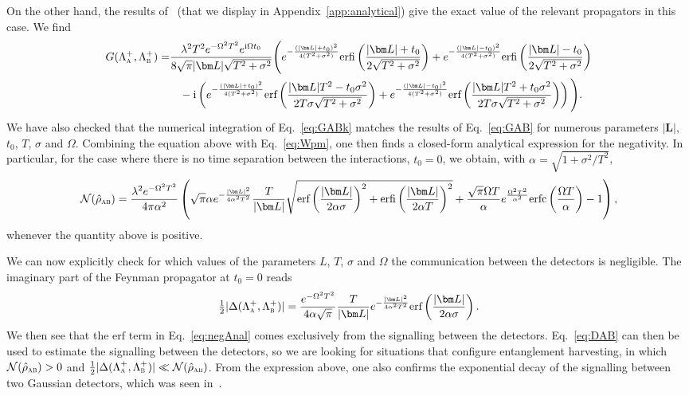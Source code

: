 \documentclass[letterpaper,12pt,titlepage,oneside,final]{book}
\newcommand{\ii}{\mathrm{i}}
\newcommand{\tc}[1]{\textsc{#1}}
\begin{document}
On the other hand, the results of~\cite{analytical} (that we display in Appendix~\ref{app:analytical}) give the exact value of the relevant propagators in this case. We find
\begin{align}
    G(\Lambda_\tc{a}^+,\Lambda_\tc{b}^+) =
    &\frac{\lambda^2 T^2e^{-\Omega^2T^2}e^{\ii \Omega t_0}}{8 \sqrt{\pi} |\bm L| \sqrt{T^2+\sigma^2}}\Bigg(e^{- \frac{(|\bm L| + t_0)^2}{4(T^2 + \sigma^2)}}\text{erfi}\left(\frac{|\bm L| +t_0}{2\sqrt{T^2 + \sigma^2}}\right)+e^{- \frac{(|\bm L| - t_0)^2}{4(T^2 + \sigma^2)}}\text{erfi}\left(\frac{|\bm L| -t_0}{2\sqrt{T^2 + \sigma^2}}\right)\nonumber\\
    &\:\:\:\:-\ii\left(e^{-\frac{(|\bm L| + t_0)^2}{4 (T^2 + \sigma^2)}}\text{erf}\left(\frac{|\bm L|T^2 - t_0\sigma^2 }{2 T \sigma\sqrt{T^{2} + \sigma^{2}}}\right)+e^{-\frac{(|\bm L| - t_0)^2}{4 (T^2 + \sigma^2)}} \text{erf}\left(\frac{|\bm L|T^2 + t_0\sigma^2 }{2 T \sigma\sqrt{T^{2} + \sigma^{2}}}\right)\right)\Bigg).\label{eq:GAB}
\end{align}
We have also checked that the numerical integration of Eq.~\eqref{eq:GABk} matches the results of Eq.~\eqref{eq:GAB} for numerous parameters $|\bm L|$, $t_0$, $T$, $\sigma$ and $\Omega$. Combining the equation above with Eq.~\eqref{eq:Wpm}, one then finds a closed-form analytical expression for the negativity. In particular, for the case where there is no time separation between the interactions, $t_0 = 0$, we obtain, with $\alpha = \sqrt{1 + \sigma^2/T^2}$,{\footnotesize
\begin{equation}
    \mathcal{N}(\hat{\rho}_\tc{ab}) = \frac{\lambda^2 e^{-\Omega^2 T^2}}{4\pi \alpha^2 } \left(\sqrt{\pi}\alpha e^{- \frac{|\bm L|^2}{4\alpha^2T^2}}\frac{T}{|\bm L| }\sqrt{\text{erf}\left(\frac{|\bm L|}{2 \alpha \sigma}\right)^2 + \text{erfi}\left(\frac{|\bm L|}{2\alpha T}\right)^2}  + \frac{\sqrt{\pi}\Omega T}{\alpha}e^{\frac{\Omega^2T^2}{\alpha^2}}\text{erfc}\left(\frac{\Omega T}{\alpha}\right)- 1 \right),\label{eq:negAnal}
\end{equation}}
whenever the quantity above is positive. 

We can now explicitly check for which values of the parameters $L$, $T$, $\sigma$ and $\Omega$ the communication between the detectors is negligible. The imaginary part of the Feynman propagator at $t_0 = 0$ reads
\begin{equation}\label{eq:DAB}
    \tfrac{1}{2}|\Delta(\Lambda_\tc{a}^+,\Lambda_\tc{b}^+)| = \frac{e^{-\Omega^2 T^2}}{4\alpha \sqrt{\pi}} \frac{T}{|\bm L|}e^{- \frac{|\bm L|^2}{4\alpha^2T^2}}\text{erf}\left(\frac{|\bm L|}{2 \alpha \sigma}\right).
\end{equation}
We then see that the $\text{erf}$ term in Eq.~\eqref{eq:negAnal} comes exclusively from the signalling between the detectors. Eq.~\eqref{eq:DAB} can then be used to estimate the signalling between the detectors, so we are looking for situations that configure entanglement harvesting, in which $\mathcal{N}(\hat{\rho}_\tc{ab})>0$ and $\frac{1}{2}|\Delta(\Lambda_\tc{a}^+,\Lambda_\tc{b}^+)|\ll\mathcal{N}(\hat{\rho}_\tc{ab})$. From the expression above, one also confirms the exponential decay of the signalling between two Gaussian detectors, which was seen in~\cite{mariaPipoNew}. 
\end{document}
